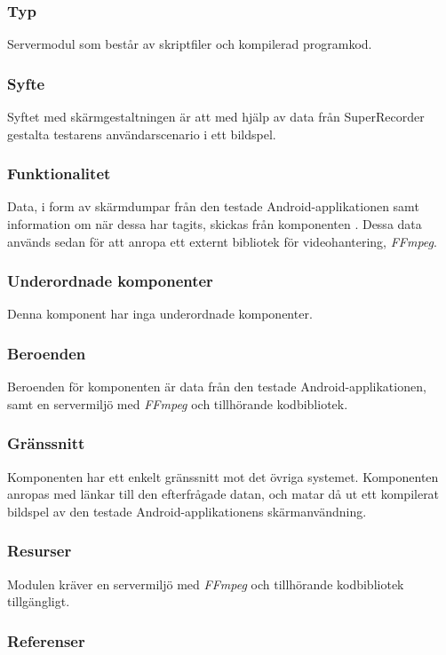 \subsubsection{Typ}
Servermodul som består av skriptfiler och kompilerad programkod.

\subsubsection{Syfte}
Syftet med skärmgestaltningen är att med hjälp av data från SuperRecorder gestalta testarens användarscenario i ett bildspel.

\subsubsection{Funktionalitet}
Data, i form av skärmdumpar från den testade Android-applikationen samt information om när dessa har tagits, skickas från komponenten . Dessa data används sedan för att anropa ett externt bibliotek för videohantering, \textit{FFmpeg}.

\subsubsection{Underordnade komponenter}
Denna komponent har inga underordnade komponenter.

\subsubsection{Beroenden}
Beroenden för komponenten är data från den testade Android-applikationen, samt en servermiljö med \textit{FFmpeg} och tillhörande kodbibliotek.

\subsubsection{Gränssnitt}
Komponenten har ett enkelt gränssnitt mot det övriga systemet. Komponenten anropas med länkar till den efterfrågade datan, och matar då ut ett kompilerat bildspel av den testade Android-applikationens skärmanvändning.

\subsubsection{Resurser}
Modulen kräver en servermiljö med \textit{FFmpeg} och tillhörande kodbibliotek tillgängligt.

\subsubsection{Referenser}

